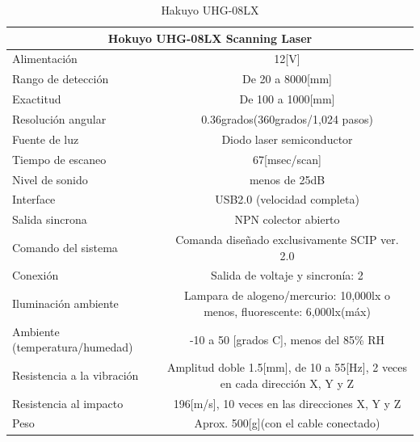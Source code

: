\documentclass[user_manual.tex]{subfiles}
\begin{document}
\begin{table}[H]

\resizebox{20cm}{!} {
\begin{tabular}{|l|l|}%

\hline
\multicolumn{2}{|c|}{Hokuyo UHG-08LX Scanning Laser} \\ \hline %
Alimentación &  \multicolumn{1}{|c|}{12[V]}\\ \hline
Rango de detección & \multicolumn{1}{|c|}{De 20 a 8000[mm]}\\ \hline
Exactitud & \multicolumn{1}{|c|}{De 100 a 1000[mm]}\\ \hline
Resolución angular & \multicolumn{1}{|c|}{0.36grados(360grados/1,024 pasos)}\\ \hline

Fuente de luz & \multicolumn{1}{|c|}{Diodo laser semiconductor }\\ \hline
Tiempo de escaneo & \multicolumn{1}{|c|}{67[msec/scan]}\\ \hline
Nivel de sonido & \multicolumn{1}{|c|}{menos de 25dB}\\ \hline
Interface & \multicolumn{1}{|c|}{USB2.0 (velocidad completa)}\\ \hline
Salida sincrona & \multicolumn{1}{|c|}{NPN colector abierto}\\ \hline
Comando del sistema & \multicolumn{1}{|c|}{Comanda diseñado exclusivamente SCIP ver. 2.0}\\ \hline
Conexión & \multicolumn{1}{|c|}{Salida de voltaje y sincronía: 2}\\ \hline
Iluminación ambiente & \multicolumn{1}{|c|}{Lampara de alogeno/mercurio: 10,000lx o menos, fluorescente: 6,000lx(máx)}\\ \hline
Ambiente (temperatura/humedad) & \multicolumn{1}{|c|}{-10 a 50 [grados C], menos del 85\% RH}\\ \hline
Resistencia a la vibración & \multicolumn{1}{|c|}{Amplitud doble 1.5[mm], de 10 a 55[Hz], 2 veces en cada dirección X, Y y Z}\\ \hline
Resistencia al impacto & \multicolumn{1}{|c|}{196[m/s], 10 veces en las direcciones X, Y y Z}\\ \hline
Peso & \multicolumn{1}{|c|}{Aprox. 500[g](con el cable conectado)}\\ \hline

\end{tabular}
}
\caption{Hakuyo UHG-08LX}
\label{Datos del Hokuyo}
\end{table}
\end{document}
